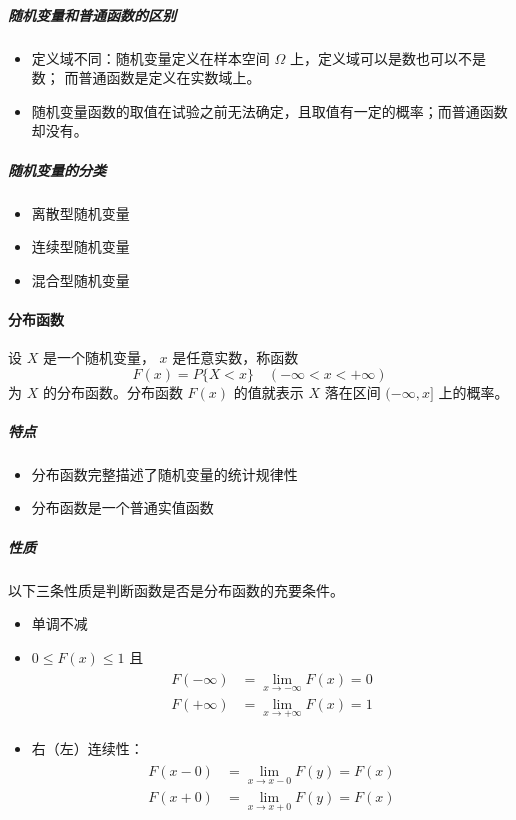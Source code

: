 \subparagraph{随机变量和普通函数的区别}
\begin{itemize}
    \item 定义域不同：随机变量定义在样本空间 $ \Omega $ 上，定义域可以是数也可以不是数；
    而普通函数是定义在实数域上。
    \item 随机变量函数的取值在试验之前无法确定，且取值有一定的概率；而普通函数却没有。
\end{itemize}

\subparagraph{随机变量的分类}
\begin{itemize}
    \item 离散型随机变量
    \item 连续型随机变量
    \item 混合型随机变量
\end{itemize}

\paragraph{分布函数} 设 $ X $ 是一个随机变量， $ x $ 是任意实数，称函数 \begin{equation}
    \label{equ:分布函数定义}
    F(x) = P\{X < x\} \quad (-\infty < x < +\infty)
\end{equation}
为 $ X $ 的分布函数。分布函数 $ F(x) $ 的值就表示 $ X $ 落在区间 $ (-\infty,x] $ 上的概率。

\subparagraph{特点} 
\begin{itemize}
    \item 分布函数完整描述了随机变量的统计规律性
    \item 分布函数是一个普通实值函数 
\end{itemize}

\subparagraph{性质} 以下三条性质是判断函数是否是分布函数的充要条件。
\begin{itemize}
    \item 单调不减
    \item  $ 0 \leqslant F(x) \leqslant 1 $ 且 \begin{align}
        \begin{split}
            F(-\infty) &= \lim_{x \rightarrow -\infty} F(x) = 0 \\
            F(+\infty) &= \lim_{x \rightarrow +\infty} F(x) = 1
        \end{split}
    \end{align}
    \item 右（左）连续性：\begin{align}
        \begin{split}
            F(x - 0) &= \lim_{x \rightarrow x - 0} F(y) = F(x) \\
            F(x + 0) &= \lim_{x \rightarrow x + 0} F(y) = F(x)
        \end{split}
    \end{align}
\end{itemize}

